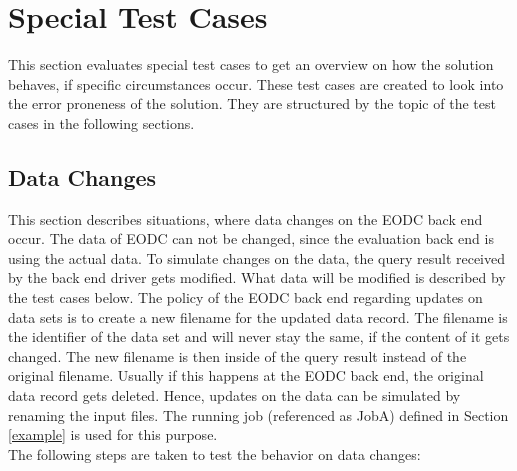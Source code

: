 \documentclass[draft,final]{vutinfth} %
\begin{document}
\section{Special Test Cases}\label{Evaluation:special}
This section evaluates special test cases to get an overview on how the solution behaves, if specific circumstances occur. These test cases are created to look into the error proneness of the solution. They are structured by the topic of the test cases in the following sections.

\subsection{Data Changes}\label{Evaluation:special_dataid}
This section describes situations, where data changes on the EODC back end occur. The data of EODC can not be changed, since the evaluation back end is using the actual data. To simulate changes on the data, the query result received by the back end driver gets modified. What data will be modified is described by the test cases below. The policy of the EODC back end regarding updates on data sets is to create a new filename for the updated data record. The filename is the identifier of the data set and will never stay the same, if the content of it gets changed. The new filename is then inside of the query result instead of the original filename. Usually if this happens at the EODC back end, the original data record gets deleted. Hence, updates on the data can be simulated by renaming the input files. The running job (referenced as JobA) defined in Section \ref{example} is used for this purpose. \\
The following steps are taken to test the behavior on data changes:
\end{document}
